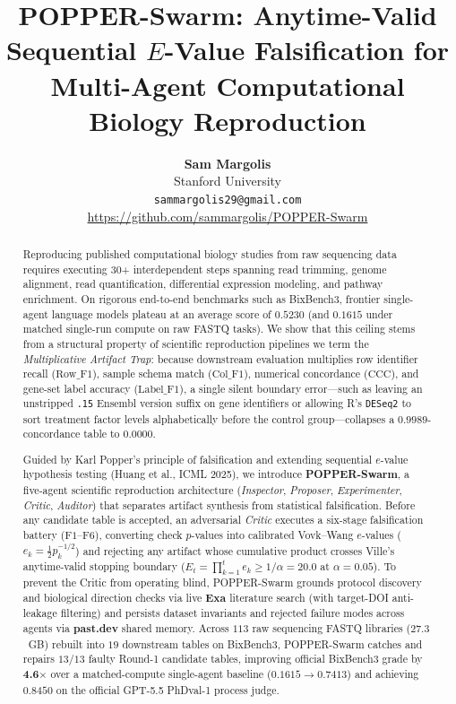 \documentclass[10pt,twocolumn]{article}
\title{\textbf{POPPER-Swarm: Anytime-Valid Sequential $E$-Value Falsification for\\Multi-Agent Computational Biology Reproduction}}
\author{
  \textbf{Sam Margolis}\\
  Stanford University\\
  \texttt{sammargolis29@gmail.com}\\
  \url{https://github.com/sammargolis/POPPER-Swarm}
}
\date{}
\begin{document}
\maketitle

\begin{abstract}
Reproducing published computational biology studies from raw sequencing data requires executing 30+ interdependent steps spanning read trimming, genome alignment, read quantification, differential expression modeling, and pathway enrichment. On rigorous end-to-end benchmarks such as BixBench3, frontier single-agent language models plateau at an average score of $0.5230$ (and $0.1615$ under matched single-run compute on raw FASTQ tasks). We show that this ceiling stems from a structural property of scientific reproduction pipelines we term the \emph{Multiplicative Artifact Trap}: because downstream evaluation multiplies row identifier recall ($\text{Row\_F1}$), sample schema match ($\text{Col\_F1}$), numerical concordance ($\text{CCC}$), and gene-set label accuracy ($\text{Label\_F1}$), a single silent boundary error---such as leaving an unstripped \texttt{.15} Ensembl version suffix on gene identifiers or allowing R's \texttt{DESeq2} to sort treatment factor levels alphabetically before the control group---collapses a $0.9989$-concordance table to $0.0000$.

Guided by Karl Popper's principle of falsification and extending sequential $e$-value hypothesis testing (Huang et al., ICML 2025), we introduce \textbf{POPPER-Swarm}, a five-agent scientific reproduction architecture (\emph{Inspector}, \emph{Proposer}, \emph{Experimenter}, \emph{Critic}, \emph{Auditor}) that separates artifact synthesis from statistical falsification. Before any candidate table is accepted, an adversarial \emph{Critic} executes a six-stage falsification battery ($\text{F1}$--$\text{F6}$), converting check $p$-values into calibrated Vovk--Wang $e$-values ($e_k = \frac{1}{2}p_k^{-1/2}$) and rejecting any artifact whose cumulative product crosses Ville's anytime-valid stopping boundary ($E_t = \prod_{k=1}^t e_k \ge 1/\alpha = 20.0$ at $\alpha = 0.05$). To prevent the Critic from operating blind, POPPER-Swarm grounds protocol discovery and biological direction checks via live \textbf{Exa} literature search (with target-DOI anti-leakage filtering) and persists dataset invariants and rejected failure modes across agents via \textbf{past.dev} shared memory. Across $113$ raw sequencing FASTQ libraries ($27.3$~GB) rebuilt into $19$ downstream tables on BixBench3, POPPER-Swarm catches and repairs $13/13$ faulty Round-1 candidate tables, improving official BixBench3 grade by \textbf{4.6$\times$} over a matched-compute single-agent baseline ($0.1615 \rightarrow \mathbf{0.7413}$) and achieving $\mathbf{0.8450}$ on the official GPT-5.5 PhDval-1 process judge.
\end{abstract}
\end{document}
